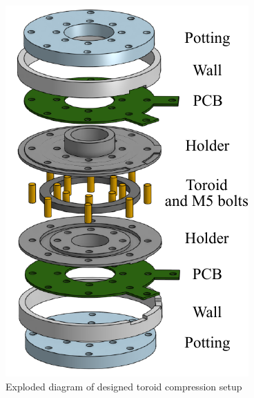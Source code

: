 \documentclass[conference]{IEEEtran}
\begin{document}
\begin{figure}
  \centering
  \includegraphics{figures/compressionholder.pdf}
  \caption{Exploded diagram of designed toroid compression setup}
  \label{fig:compressionholder}
\end{figure}
\end{document}
